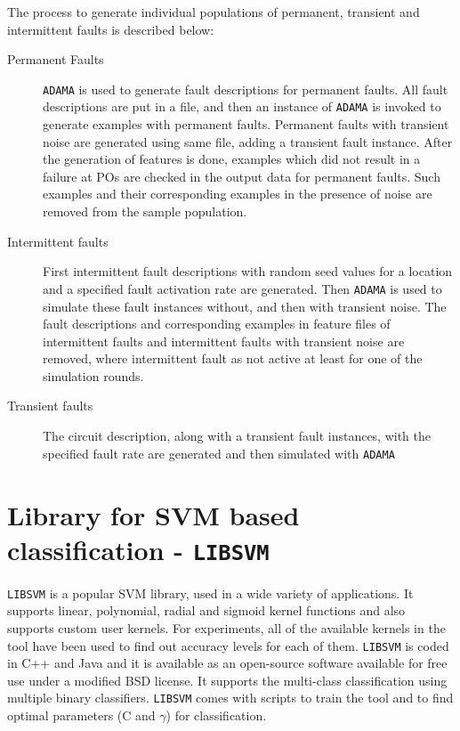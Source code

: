 The process to generate individual populations of permanent, transient and intermittent faults is described below:

\begin{description}
  \item[Permanent Faults] \texttt{ADAMA} is used to generate fault descriptions for permanent faults. All fault descriptions are put in a file, and then an instance of \texttt{ADAMA} is invoked to generate examples with permanent faults. Permanent faults with transient noise are generated using same file, adding a transient fault instance. After the generation of features is done, examples which did not result in a failure at POs are checked in the output data for permanent faults. Such examples and their corresponding examples in the presence of noise are removed from the sample population.

  \item[Intermittent faults] First intermittent fault descriptions with random seed values for a location and a specified fault activation rate are generated. Then \texttt{ADAMA} is used to simulate these fault instances without, and then with transient noise. The fault descriptions and corresponding examples in feature files of intermittent faults and intermittent faults with transient noise are removed, where intermittent fault as not active at least for one of the simulation rounds.

  \item[Transient faults] The circuit description, along with a transient fault instances, with the specified fault rate are generated and then simulated with \texttt{ADAMA}

\end{description}

\section{Library for SVM based classification - \texttt{LIBSVM}}
\label{sec:libsvm}
\texttt{LIBSVM} \cite{Chang2011} is a popular SVM library, used in a wide variety of applications. It supports linear, polynomial, radial and sigmoid kernel functions and also supports custom user kernels. For experiments, all of the available kernels in the tool have been used to find out accuracy levels for each of them. \texttt{LIBSVM} is coded in C++ and Java and it is available as an open-source software available for free use under a modified BSD license. It supports the multi-class classification using multiple binary classifiers. \texttt{LIBSVM} comes with scripts to train the tool and to find optimal parameters (C and $\gamma$) for classification.

